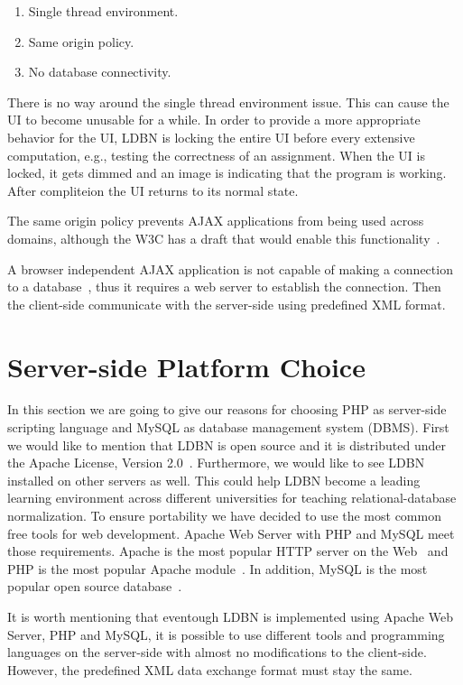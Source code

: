 \begin{enumerate}
	\item Single thread environment.
	\item Same origin policy.
	\item No database connectivity.
\end{enumerate}

There is no way around the single thread environment issue. This can cause the UI
to become unusable for a while. In order to provide a more appropriate behavior 
for the UI, LDBN is locking the entire UI before every extensive computation, e.g.,
testing the correctness of an assignment. When the UI is locked,
it gets dimmed and an image is indicating that the program is working. After 
compliteion the UI returns to its normal state. 

The same origin policy prevents AJAX applications from being used across domains,
although the W3C has a draft that would enable this functionality~\cite{bajax1}.

A browser independent AJAX application is not capable of making a connection 
to a database~\cite{bajax1}, thus it requires a web server to establish the 
connection. Then the client-side communicate with the server-side using 
predefined XML format.

\section{Server-side Platform Choice}
In this section we are going to give our reasons for choosing PHP as server-side
scripting language and MySQL as database management system (DBMS). First we would
like to mention that LDBN is open source and it is distributed under the 
Apache License, Version 2.0~\cite{walv2}. Furthermore, we would like to see 
LDBN installed on other servers as well. This could help LDBN become
a leading learning environment across 
different universities for teaching relational-database normalization. To ensure 
portability we have decided to use the most common free 
tools for web development. Apache Web Server with PHP and MySQL meet those requirements. 
Apache is the most popular HTTP server on the Web~\cite{w3} and PHP is the most popular 
Apache module~\cite{w4}. In addition, MySQL is the most popular open source 
database~\cite{w5}.
 
It is worth mentioning that eventough LDBN is implemented using Apache Web Server,
PHP and MySQL, it is possible to use different tools and programming languages 
on the server-side with almost no modifications to the client-side. However, 
the predefined XML data exchange format must stay the same.

